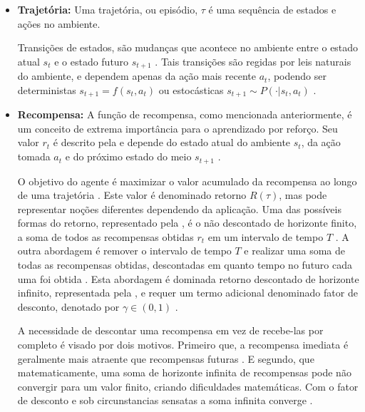 \begin{itemize}
    \item \textbf{Trajetória:} Uma trajetória, ou episódio, $\tau$ é uma sequência de estados e ações no ambiente.


    Transições de estados, são mudanças que acontece no ambiente entre o estado atual $s_t$ e o estado futuro $s_{t+1}$ \cite{rl_intro}. Tais transições são regidas por leis naturais do ambiente, e dependem apenas da ação mais recente $a_t$, podendo ser deterministas $s_{t+1} = f(s_t, a_t)$ ou estocásticas $s_{t+1} \sim P(\cdot|s_t, a_t)$ \cite{rl_intro}.

    \item \textbf{Recompensa:} A função de recompensa, como mencionada anteriormente, é um conceito de extrema importância para o aprendizado por reforço. Seu valor $r_t$ é descrito pela  e depende do estado atual do ambiente $s_t$, da ação tomada $a_t$ e do próximo estado do meio $s_{t+1}$ \cite{rl_intro}.


    O objetivo do agente é maximizar o valor acumulado da recompensa ao longo de uma trajetória \cite{rl_intro}. Este valor é denominado retorno $R(\tau)$, mas pode representar noções diferentes dependendo da aplicação. Uma das possíveis formas do retorno, representado pela , é o não descontado de horizonte finito, a soma de todos as recompensas obtidas $r_t$ em um intervalo de tempo $T$ \cite{deeprl}. A outra abordagem é remover o intervalo de tempo $T$ e realizar uma soma de todas as recompensas obtidas, descontadas em quanto tempo no futuro cada uma foi obtida \cite{rl_intro}. Esta abordagem é dominada retorno descontado de horizonte infinito, representada pela , e requer um termo adicional denominado fator de desconto, denotado por $\gamma \in (0,1)$ \cite{machinelearning}.


    A necessidade de descontar uma recompensa em vez de recebe-las por completo é visado por dois motivos. Primeiro que, a recompensa imediata é geralmente mais atraente que recompensas futuras \cite{SpinningUp2018}. E segundo, que matematicamente, uma soma de horizonte infinita de recompensas pode não convergir para um valor finito, criando dificuldades matemáticas. Com o fator de desconto e sob circunstancias sensatas a soma infinita converge \cite{SpinningUp2018}.
    

\end{itemize}
